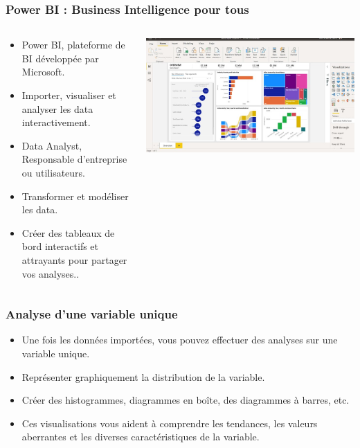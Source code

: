 \documentclass{beamer}
\begin{document}
\begin{frame}
	\frametitle{Power BI : Business Intelligence pour tous}
	
	\begin{columns}[T] %
		\begin{column}{0.5\textwidth}
			\begin{itemize}
				\item Power BI, plateforme de BI développée par Microsoft.
				\item Importer, visualiser et analyser les data  interactivement.
				\item Data Analyst, Responsable d'entreprise ou utilisateurs.
				\item Transformer et modéliser les data.
				\item Créer des tableaux de bord interactifs et attrayants pour partager vos analyses..
			\end{itemize}
		\end{column}
		\begin{column}{0.5\textwidth}
			\begin{center}
				\includegraphics[width=\textwidth]{power-bi-data.jpg}
			\end{center}
		\end{column}
	\end{columns}
	
\end{frame}


\begin{frame}
	\frametitle{Analyse d'une variable unique}
	
	\begin{itemize}
		\item Une fois les données importées, vous pouvez effectuer des analyses sur une variable unique.
		\item Représenter graphiquement la distribution de la variable.
		\item Créer des histogrammes, diagrammes en boîte, des diagrammes à barres, etc.
		\item Ces visualisations vous aident à comprendre les tendances, les valeurs aberrantes et les diverses caractéristiques de la variable.
	\end{itemize}
	
\end{frame}
\end{document}
